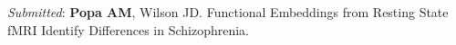\documentclass[line,margin,10pt]{res}
\begin{document}
\begin{resume}
{\sl Submitted}: \textbf{Popa AM}, Wilson JD. Functional Embeddings from Resting State fMRI Identify Differences in Schizophrenia.


%


\end{resume}
\end{document}
